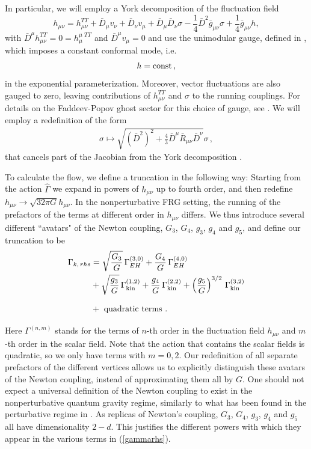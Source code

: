\documentclass[11pt]{book} %
\newcommand{\be}{\begin{equation}}
\newcommand{\ee}{\end{equation}}
\begin{document}
In particular, we will employ a York decomposition of the fluctuation field
\be
h_{\mu \nu} = h_{\mu \nu}^{TT} + \bar{D}_{\mu}v_{\nu}+ \bar{D}_{\nu}v_{\mu} + \bar{D}_{\mu}\bar{D}_{\nu}\sigma - \frac{1}{4}\bar{D}^2 \bar{g}_{\mu \nu}\sigma + \frac{1}{4}\bar{g}_{\mu \nu}h,
\ee
with $\bar{D}^{\mu}h_{\mu \nu}^{TT}=0=h^{\mu\, \, TT}_{\mu}$ and $\bar{D}^{\mu}v_{\mu}=0$
and  use the unimodular gauge, defined in \cite{Percacci:2015wwa},
which imposes a constant conformal mode, i.e.
\begin{align}
  h = \rm const \,,
\end{align}
in the exponential parameterization.
Moreover, vector fluctuations are also gauged to zero,
leaving contributions of $h_{\mu \nu}^{TT}$ and $\sigma$ to the running couplings.
For details on the Faddeev-Popov ghost sector for this choice of gauge, see \cite{Percacci:2015wwa}.
We will employ a redefinition of the form
\begin{align}
  \sigma \mapsto \sqrt{(\bar{D}^{2})^2+\frac{4}{3}\bar{D}^{\mu}\bar{R}_{\mu \nu}\bar{D}^{\nu}} \sigma \,,
\end{align}
that cancels part of the Jacobian from the York decomposition \cite{Dou:1997fg}.

To calculate the flow, we define a truncation in the following way:
Starting from the action $\hat{\Gamma}$ we expand in powers of $h_{\mu \nu}$ up to fourth order,
and then redefine $h_{\mu \nu} \rightarrow \sqrt{32 \pi G} h_{\mu\nu}$. In the nonperturbative FRG setting,
the running of the prefactors of the terms at different order in $h_{\mu \nu}$ differs.
We thus introduce several different ``avatars" of the Newton coupling, $G_3$, $G_4$, $g_3$,
$g_4$ and $g_5$, and define our truncation to be
\begin{align}
  \Gamma_{k, \, rhs} &= \sqrt{\frac{G_3}{G}} \, \Gamma_{EH}^{(3,0)} + \frac{G_4}{G} \, \Gamma_{EH}^{(4,0)} \nonumber \\
                     & + \sqrt{\frac{g_3}{G}} \, \Gamma_{\rm kin}^{(1,2)} + \frac{g_4}{ G} \, \Gamma_{\rm kin}^{(2,2)} + \left(\frac{g_5}{ G}\right)^{3/2} \, \Gamma_{\rm kin}^{(3,2)}\nonumber\\
                     & + \vphantom{ \sqrt{\frac{g_3}{G}} }\mbox{ quadratic terms }.
  \label{gammarhs}
\end{align}
Here $\Gamma^{(n,m)}$ stands for the terms of $n$-th order in the fluctuation field $h_{\mu \nu}$
and $m$-th order in the scalar field.
Note that the action that contains the scalar fields is quadratic,
so we only have terms with $m=0,2$.
Our redefinition of all separate prefactors of the different vertices allows us to explicitly distinguish
these avatars of the Newton coupling, instead of approximating them all by $G$.
One should not expect a universal definition of the Newton coupling to exist in the nonperturbative
quantum gravity regime, similarly to what has been found in the perturbative regime in \cite{Anber:2011ut}.
As replicas of Newton's coupling, $G_3$, $G_4$, $g_3$, $g_4$ and $g_5$ all have dimensionality $2-d$.
This justifies the different powers with which they appear
in the various terms in (\ref{gammarhs}).
\end{document}
